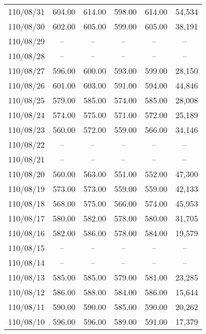 \begin{longtable}{@{}cccccc@{}}
110/08/31 & 604.00    & 614.00    & 598.00    & 614.00    & 54,534    \\
110/08/30 & 602.00    & 605.00    & 599.00    & 605.00    & 38,191    \\
\rowcolor{gray(x11gray)}
110/08/29 & --~       & --~       & --~       & --~       & --~       \\
\rowcolor{gray(x11gray)}
110/08/28 & --~       & --~       & --~       & --~       & --~       \\
110/08/27 & 596.00    & 600.00    & 593.00    & 599.00    & 28,150    \\
110/08/26 & 601.00    & 603.00    & 591.00    & 594.00    & 44,846    \\
110/08/25 & 579.00    & 585.00    & 574.00    & 585.00    & 28,008    \\
110/08/24 & 574.00    & 575.00    & 571.00    & 572.00    & 25,189    \\
110/08/23 & 560.00    & 572.00    & 559.00    & 566.00    & 34,146    \\
\rowcolor{gray(x11gray)}
110/08/22 & --~       & --~       & --~       & --~       & --~       \\
\rowcolor{gray(x11gray)}
110/08/21 & --~       & --~       & --~       & --~       & --~       \\
110/08/20 & 560.00    & 563.00    & 551.00    & 552.00    & 47,300    \\
110/08/19 & 573.00    & 573.00    & 559.00    & 559.00    & 42,133    \\
110/08/18 & 568.00    & 575.00    & 566.00    & 574.00    & 45,953    \\
110/08/17 & 580.00    & 582.00    & 578.00    & 580.00    & 31,705    \\
110/08/16 & 582.00    & 586.00    & 578.00    & 584.00    & 19,579    \\
\rowcolor{gray(x11gray)}
110/08/15 & --~       & --~       & --~       & --~       & --~       \\
\rowcolor{gray(x11gray)}
110/08/14 & --~       & --~       & --~       & --~       & --~       \\
110/08/13 & 585.00    & 585.00    & 579.00    & 581.00    & 23,285    \\
110/08/12 & 586.00    & 588.00    & 584.00    & 586.00    & 15,644    \\
110/08/11 & 590.00    & 590.00    & 585.00    & 590.00    & 20,262    \\
110/08/10 & 596.00    & 596.00    & 589.00    & 591.00    & 17,379    \\

\end{longtable}
